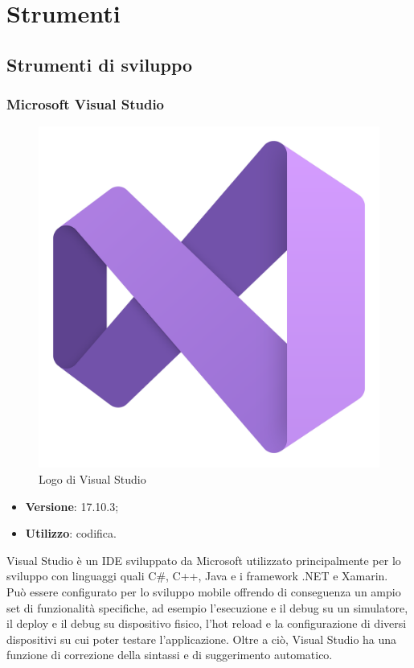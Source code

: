 



\section{Strumenti}

\subsection{Strumenti di sviluppo}

\subsubsection{Microsoft Visual Studio}

\begin{figure}[H]
    \centering 
    \includegraphics[width=0.3\columnwidth]{images/loghi/Visual_Studio.png} 
    \caption{Logo di Visual Studio}
\end{figure}

\begin{itemize}
    \item \textbf{Versione}: 17.10.3;
    \item \textbf{Utilizzo}: codifica.
\end{itemize}
Visual Studio è un IDE sviluppato da Microsoft utilizzato principalmente per lo sviluppo con linguaggi quali C\#, C++, Java e i framework .NET e Xamarin.\\
Può essere configurato per lo sviluppo mobile offrendo di conseguenza un ampio set di funzionalità specifiche, ad esempio l'esecuzione e il debug su un simulatore, il deploy e il debug su dispositivo fisico, l'hot reload e la configurazione di diversi dispositivi su cui poter testare l'applicazione. Oltre a ciò, Visual Studio ha una funzione di correzione della sintassi e di suggerimento automatico.

